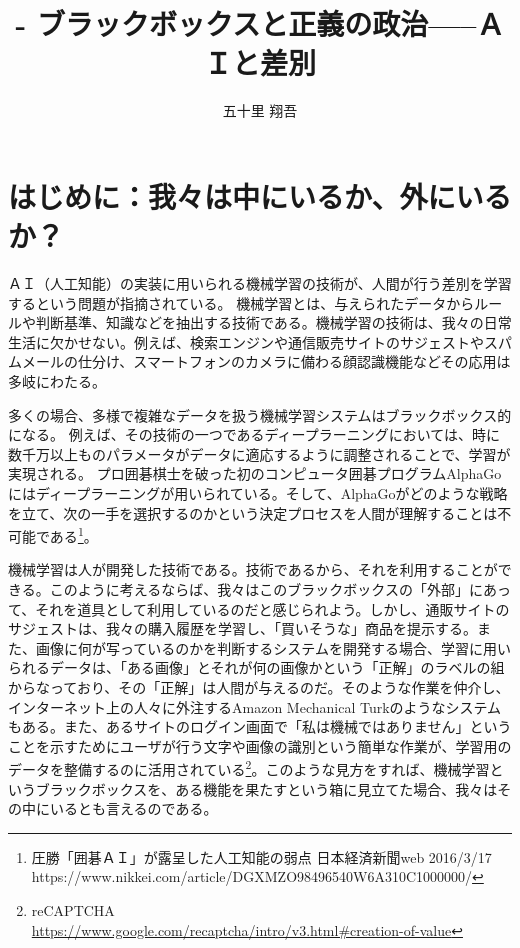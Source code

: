 \documentclass[b5j,twoside,twocolumn]{utarticle}
\title{-\tbaselineshift=4.0pt ブラックボックスと正義の政治-----ＡＩと差別}
\author{五十里 翔吾}
\date{\vspace{-5mm}}
\begin{document}

\maketitle


\setlength{\footskip}{-2mm}
\chead[]{}
\lfoot[]{\thepage{}}
\cfoot[]{}
\rfoot[\thepage{}]{}

\thispagestyle{fancy}
\renewcommand{\footnoterule}{\noindent\rule{100mm}{0.3mm}\vskip2mm}


\section{はじめに：我々は中にいるか、外にいるか？}
ＡＩ（人工知能）の実装に用いられる機械学習の技術が、人間が行う差別を学習するという問題が指摘されている。
機械学習とは、与えられたデータからルールや判断基準、知識などを抽出する技術である。機械学習の技術は、我々の日常生活に欠かせない。例えば、検索エンジンや通信販売サイトのサジェストやスパムメールの仕分け、スマートフォンのカメラに備わる顔認識機能などその応用は多岐にわたる。


多くの場合、多様で複雑なデータを扱う機械学習システムはブラックボックス的になる。
例えば、その技術の一つであるディープラーニングにおいては、時に数千万以上ものパラメータがデータに適応するように調整されることで、学習が実現される。
プロ囲碁棋士を破った初のコンピュータ囲碁プログラムAlphaGoにはディープラーニングが用いられている。そして、AlphaGoがどのような戦略を立て、次の一手を選択するのかという決定プロセスを人間が理解することは不可能である\footnote{圧勝「囲碁ＡＩ」が露呈した人工知能の弱点 日本経済新聞web 2016/3/17 https://www.nikkei.com/article/DGXMZO98496540W6A310C1000000/}。


機械学習は人が開発した技術である。技術であるから、それを利用することができる。このように考えるならば、我々はこのブラックボックスの「外部」にあって、それを道具として利用しているのだと感じられよう。しかし、通販サイトのサジェストは、我々の購入履歴を学習し、「買いそうな」商品を提示する。また、画像に何が写っているのかを判断するシステムを開発する場合、学習に用いられるデータは、「ある画像」とそれが何の画像かという「正解」のラベルの組からなっており、その「正解」は人間が与えるのだ。そのような作業を仲介し、インターネット上の人々に外注するAmazon Mechanical Turkのようなシステムもある。また、あるサイトのログイン画面で「私は機械ではありません」ということを示すためにユーザが行う文字や画像の識別という簡単な作業が、学習用のデータを整備するのに活用されている\footnote{reCAPTCHA\\\url{https://www.google.com/recaptcha/intro/v3.html#creation-of-value}}。このような見方をすれば、機械学習というブラックボックスを、ある機能を果たすという箱に見立てた場合、我々はその中にいるとも言えるのである。
\end{document}
